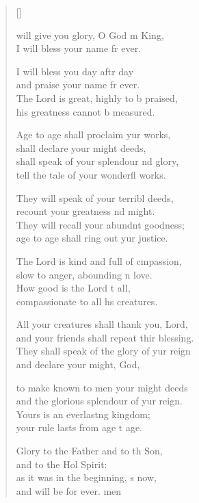 \settowidth{\versewidth}{All your creatures shall thank you, O Lord, *}
\begin{verse}[\versewidth]
  \begin{patverse}
 will give you glory, O God m King, \Med\\
I will bless your name fr ever.

I will bless you day aftr day\Med\\
and praise your name fr ever.\\
The Lord is great, highly to b praised,\Med\\
his greatness cannot b measured.

Age to age shall proclaim yur works,\Med\\
shall declare your might deeds,\\
shall speak of your splendour nd glory,\Med\\
tell the tale of your wonderfl works.

They will speak of your terribl deeds,\Med\\
recount your greatness nd might.\\
They will recall your abundnt goodness;\Med\\
age to age shall ring out yur justice.

The Lord is kind and full of cmpassion,\Med\\
slow to anger, abounding \pointup{\i}n love.\\
How good is the Lord t all,\Med\\
compassionate to all h\pointup{\i}s creatures.

All your creatures shall thank you,  Lord,\Med\\
and your friends shall repeat thir blessing.\\
They shall speak of the glory of yur reign\Med\\
and declare your might,  God,

to make known to men your might deeds\Med\\
and the glorious splendour of yur reign.\\
Yours is an everlast\pointup{\i}ng kingdom;\Med\\
your rule lasts from age t age.

Glory to the Father and to th Son,\Med\\
and to the Hol Spirit:\\
as it was in the beginning, \pointup{\i}s now,\Med\\
and will be for ever. men
  \end{patverse}
\end{verse}
